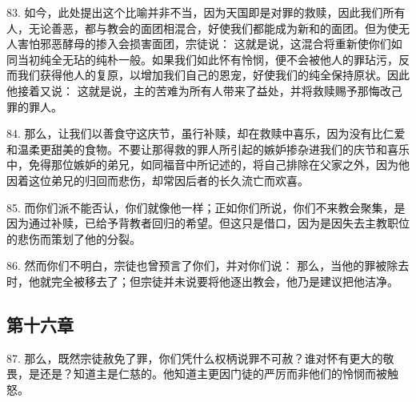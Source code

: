 83. 如今，此处提出这个比喻并非不当，因为天国即是对罪的救赎，因此我们所有人，无论善恶，都与教会的面团相混合，好使我们都能成为新和的面团。但为使无人害怕邪恶酵母的掺入会损害面团，宗徒说： 这就是说，这混合将重新使你们如同当初纯全无玷的纯朴一般。如果我们如此怀有怜悯，便不会被他人的罪玷污，反而我们获得他人的复原，以增加我们自己的恩宠，好使我们的纯全保持原状。因此他接着又说： 这就是说，主的苦难为所有人带来了益处，并将救赎赐予那悔改己罪的罪人。\par

84. 那么，让我们以善食守这庆节，虽行补赎，却在救赎中喜乐，因为没有比仁爱和温柔更甜美的食物。不要让那得救的罪人所引起的嫉妒掺杂进我们的庆节和喜乐中，免得那位嫉妒的弟兄，如同福音中所记述的，将自己排除在父家之外，因为他因着这位弟兄的归回而悲伤，却常因后者的长久流亡而欢喜。\par

85. 而你们派不能否认，你们就像他一样；正如你们所说，你们不来教会聚集，是因为通过补赎，已给予背教者回归的希望。但这只是借口，因为是因失去主教职位的悲伤而策划了他的分裂。\par

86. 然而你们不明白，宗徒也曾预言了你们，并对你们说： 那么，当他的罪被除去时，他就完全被移去了；但宗徒并未说要将他逐出教会，他乃是建议把他洁净。\par


\subsection{第十六章}

\par

87. 那么，既然宗徒赦免了罪，你们凭什么权柄说罪不可赦？谁对怀有更大的敬畏，是还是？知道主是仁慈的。他知道主更因门徒的严厉而非他们的怜悯而被触怒。\par

